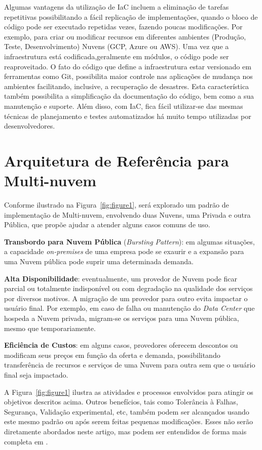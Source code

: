 \documentclass[12pt]{article}
\begin{document}
	Algumas vantagens da utilização de IaC incluem a eliminação de tarefas repetitivas possibilitando a fácil replicação de implementações, quando o bloco de código pode ser executado repetidas vezes, fazendo poucas modificações. Por exemplo, para criar ou modificar recursos em diferentes ambientes (Produção, Teste, Desenvolvimento) Nuvens (GCP, Azure ou AWS). Uma vez que a infraestrutura está codificada,geralmente em módulos, o código pode ser reaproveitado. O fato do código que define a infraestrutura estar versionado em ferramentas como Git, possibilita maior controle nas aplicações de mudança nos ambientes facilitando, inclusive, a recuperação de desastres. Esta característica também possibilita a simplificação da documentação do código, bem como a sua manutenção e suporte. Além disso, com IaC, fica fácil utilizar-se das mesmas técnicas de planejamento e testes automatizados há muito tempo utilizadas por desenvolvedores.
	
	\section{Arquitetura de Referência para Multi-nuvem}
	
	Conforme ilustrado na Figura~\ref{fig:figure1}, será explorado um padrão de implementação de Multi-nuvem, envolvendo duas Nuvens, uma Privada e outra Pública, que propõe ajudar a atender alguns casos comuns de uso.
	
	\textbf{Transbordo para Nuvem Pública} (\textit{Bursting Pattern}): em algumas situações, a capacidade \textit{on-premises} de uma empresa pode se exaurir e a expansão para uma Nuvem pública pode suprir uma determinada demanda.
	
	\textbf{Alta Disponibilidade}: eventualmente, um provedor de Nuvem pode ficar parcial ou totalmente indisponível ou com degradação na qualidade dos serviços por diversos motivos. A migração de um provedor para outro evita impactar o usuário final. Por exemplo, em caso de falha ou manutenção do \textit{Data Center} que hospeda a Nuvem privada, migram-se os serviços para uma Nuvem pública, mesmo que temporariamente.
	   
	\textbf{Eficiência de Custos}: em alguns casos, provedores oferecem descontos ou modificam seus preços em função da oferta e demanda, possibilitando transferência de recursos e serviços de uma Nuvem para outra sem que o usuário final seja impactado.
	
	A Figura~\ref{fig:figure1} ilustra as atividades e processos envolvidos para atingir os objetivos descritos acima. Outros benefícios, tais como Tolerância à Falhas, Segurança, Validação experimental, etc, também podem ser alcançados usando este mesmo padrão ou após serem feitas pequenas modificações. Esses não serão diretamente abordados neste artigo, mas podem ser entendidos de forma mais completa em \cite{Fisher:2018}.
	
\end{document}
